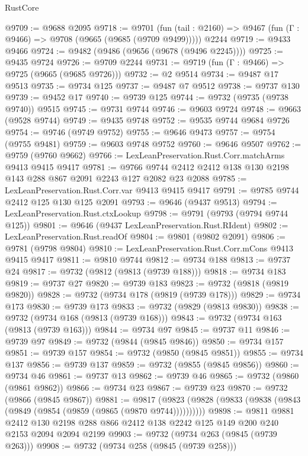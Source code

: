 \begin{lexlean}{RustCore}
\begin{coremodule}
@9709 := @9688 @2095
@9718 := @9701
    (fun (tail : @2160) => @9467 (fun (Γ : @9466) => @9708 (@9665 (@9685 (@9709 @9499)))))
    @2244
@9719 := @9433 @9466
@9724 := @9482 (@9486 (@9656 (@9678 (@9496 @2245))))
@9725 := @9435 @9724
@9726 := @9709 @2244
@9731 := @9719 (fun (Γ : @9466) => @9725 (@9665 (@9685 @9726)))
@9732 := @2 @9514
@9734 := @9487 @17 @9513
@9735 := @9734 @125
@9737 := @9487 @7 @9512
@9738 := @9737 @130
@9739 := @9452 @17
@9740 := @9739 @125
@9744 := @9732 (@9735 (@9738 @9740)) @9515
@9745 := @9731 @9744
@9746 := @9603 @9724
@9748 := @9663 (@9528 @9744)
@9749 := @9435 @9748
@9752 := @9535 @9744 @9684 @9726
@9754 := @9746 (@9749 @9752)
@9755 := @9646 @9473
@9757 := @9754 (@9755 @9481)
@9759 := @9603 @9748 @9752
@9760 := @9646 @9507
@9762 := @9759 (@9760 @9662)
@9766 := LexLeanPreservation.Rust.Corr.matchArms @9413 @9415 @9417
@9781 := @9766 @9744 @2412 @2412 @138 @130 @2198 @143 @288 @867 @2091 @2243 @127 @2082 @23 @2088
@9785 := LexLeanPreservation.Rust.Corr.var @9413 @9415 @9417
@9791 := @9785 @9744 @2412 @125 @130 @125 @2091
@9793 := @9646 (@9437 @9513)
@9794 := LexLeanPreservation.Rust.ctxLookup
@9798 := @9791 (@9793 (@9794 @9744 @125))
@9801 := @9646 (@9437 LexLeanPreservation.Rust.RIdent)
@9802 := LexLeanPreservation.Rust.readOf
@9804 := @9801 (@9802 @2091)
@9806 := @9781 (@9798 @9804)
@9810 := LexLeanPreservation.Rust.Corr.mCons @9413 @9415 @9417
@9811 := @9810 @9744
@9812 := @9734 @188
@9813 := @9737 @24
@9817 := @9732 (@9812 (@9813 (@9739 @188)))
@9818 := @9734 @183
@9819 := @9737 @27
@9820 := @9739 @183
@9823 := @9732 (@9818 (@9819 @9820))
@9828 := @9732 (@9734 @178 (@9819 (@9739 @178)))
@9829 := @9734 @173
@9830 := @9739 @173
@9833 := @9732 (@9829 (@9813 @9830))
@9838 := @9732 (@9734 @168 (@9813 (@9739 @168)))
@9843 := @9732 (@9734 @163 (@9813 (@9739 @163)))
@9844 := @9734 @97
@9845 := @9737 @11
@9846 := @9739 @97
@9849 := @9732 (@9844 (@9845 @9846))
@9850 := @9734 @157
@9851 := @9739 @157
@9854 := @9732 (@9850 (@9845 @9851))
@9855 := @9734 @137
@9856 := @9739 @137
@9859 := @9732 (@9855 (@9845 @9856))
@9860 := @9734 @46
@9861 := @9737 @13
@9862 := @9739 @46
@9865 := @9732 (@9860 (@9861 @9862))
@9866 := @9734 @23
@9867 := @9739 @23
@9870 := @9732 (@9866 (@9845 @9867))
@9881 := @9817 (@9823 (@9828 (@9833 (@9838 (@9843 (@9849 (@9854 (@9859 (@9865 (@9870 @9744))))))))))
@9898 := @9811
    @9881
    @2412
    @130
    @2198
    @288
    @866
    @2412
    @138
    @2242
    @125
    @149
    @200
    @240
    @2153
    @2094
    @2094
    @2199
@9903 := @9732 (@9734 @263 (@9845 (@9739 @263)))
@9908 := @9732 (@9734 @258 (@9845 (@9739 @258)))

\end{coremodule}
\end{lexlean}
